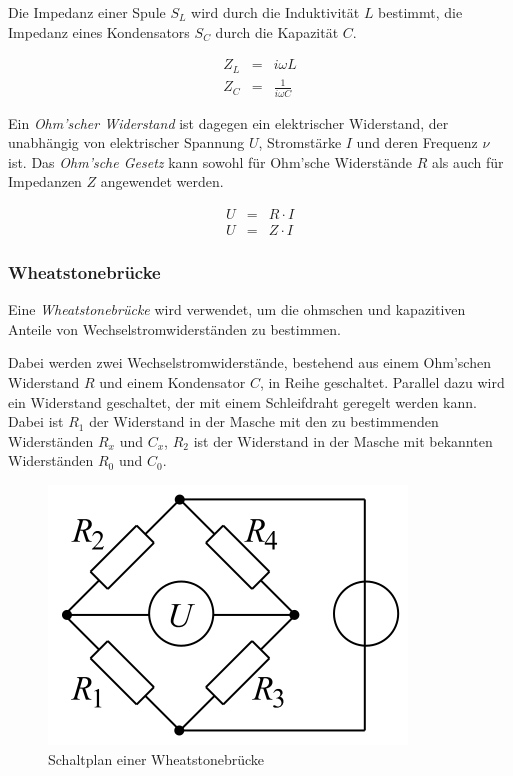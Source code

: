 \documentclass[12pt,a4paper]{scrartcl}
\numberwithin{equation}{section} %
\begin{document}
Die Impedanz einer Spule $S_L$ wird durch die Induktivität $L$
bestimmt, die Impedanz eines Kondensators $S_C$ durch die Kapazität
$C$.

\begin{eqnarray}
    Z_L &=& i\omega L \\
    Z_C &=& \frac{1}{i\omega C}
\end{eqnarray}

Ein \emph{Ohm'scher Widerstand} ist dagegen ein elektrischer Widerstand,
der unabhängig von elektrischer Spannung $U$, Stromstärke $I$ und
deren Frequenz $\nu$ ist. Das \emph{Ohm'sche Gesetz} kann sowohl für
Ohm'sche Widerstände $R$ als auch für Impedanzen $Z$ angewendet
werden.

\begin{eqnarray}
    U &=& R\cdot I \\
    U &=& Z\cdot I
\end{eqnarray}

\hypertarget{wheatstonebruxfccke}{%
\subsubsection{Wheatstonebrücke}\label{wheatstonebruxfccke}}

Eine \emph{Wheatstonebrücke} wird verwendet, um die ohmschen und
kapazitiven Anteile von Wechselstromwiderständen zu bestimmen.

Dabei werden zwei Wechselstromwiderstände, bestehend aus einem Ohm'schen
Widerstand $R$ und einem Kondensator $C$, in Reihe geschaltet.
Parallel dazu wird ein Widerstand geschaltet, der mit einem Schleifdraht
geregelt werden kann. Dabei ist $R_1$ der Widerstand in der Masche mit
den zu bestimmenden Widerständen $R_x$ und $C_x$, $R_2$ ist der
Widerstand in der Masche mit bekannten Widerständen $R_0$ und $C_0$.

\begin{figure}
	\centering
	\includegraphics{../media/B1.5/WhBr_Diagonalbild.png}
	\caption{Schaltplan einer Wheatstonebrücke \cite{File:WhBr_Diagonalbild}}
\end{figure}
\end{document}
